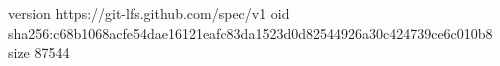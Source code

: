 version https://git-lfs.github.com/spec/v1
oid sha256:c68b1068acfe54dae16121eafc83da1523d0d82544926a30c424739ce6c010b8
size 87544
